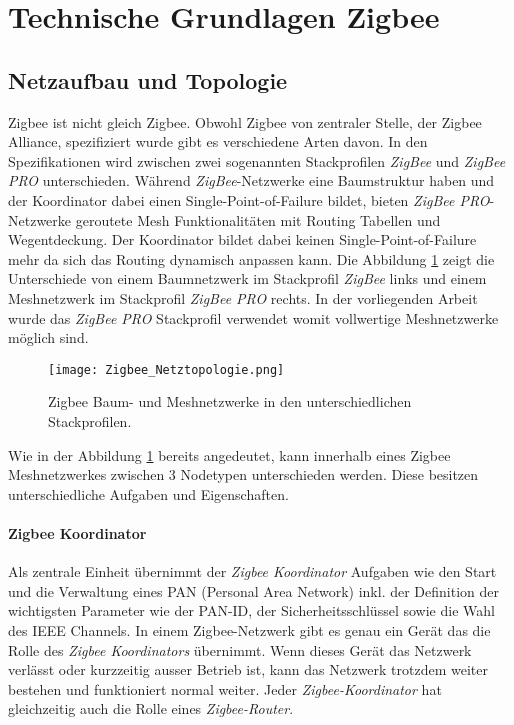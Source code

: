 \clearpage
\section{Technische Grundlagen Zigbee}\label{sec:TechnischeGrundlagenZigbee}

\subsection{Netzaufbau und Topologie}\label{subsec:NetzaufbauundTopologie}


Zigbee ist nicht gleich Zigbee. Obwohl Zigbee von zentraler Stelle, der Zigbee Alliance, spezifiziert wurde gibt es verschiedene Arten davon. In den Spezifikationen wird zwischen zwei sogenannten Stackprofilen \textit{ZigBee} und \textit{ZigBee PRO} unterschieden.
Während \textit{ZigBee}-Netzwerke eine Baumstruktur haben und der Koordinator dabei einen Single-Point-of-Failure bildet, bieten \textit{ZigBee PRO}-Netzwerke geroutete Mesh Funktionalitäten mit Routing Tabellen und Wegentdeckung. Der Koordinator bildet dabei keinen Single-Point-of-Failure mehr da sich das Routing dynamisch anpassen kann.
Die Abbildung \ref{fig:NetzwerktopologienZigbee} zeigt die Unterschiede von einem Baumnetzwerk im Stackprofil \textit{ZigBee} links und einem Meshnetzwerk im Stackprofil \textit{ZigBee PRO} rechts.
In der vorliegenden Arbeit wurde das \textit{ZigBee PRO} Stackprofil verwendet womit vollwertige Meshnetzwerke möglich sind.

\begin{figure}[h]
	\centering
	\texttt{[image: Zigbee\_Netztopologie.png]}
	\caption{Zigbee Baum- und Meshnetzwerke in den unterschiedlichen Stackprofilen. \cite{markus_krause_rainer_konrad_drahtlose_2014}}
	\label{fig:NetzwerktopologienZigbee}
\end{figure}

Wie in der Abbildung \ref{fig:NetzwerktopologienZigbee} bereits angedeutet, kann innerhalb eines Zigbee Meshnetzwerkes zwischen 3 Nodetypen unterschieden werden. Diese besitzen unterschiedliche Aufgaben und Eigenschaften.

\paragraph{Zigbee Koordinator}\label{par:ZigbeeKoordinator}
Als zentrale Einheit übernimmt der \textit{Zigbee Koordinator} Aufgaben wie den Start und die Verwaltung eines PAN (Personal Area Network) inkl. der Definition der wichtigsten Parameter wie der PAN-ID, der Sicherheitsschlüssel sowie die Wahl des IEEE Channels.
In einem Zigbee-Netzwerk gibt es genau ein Gerät das die Rolle des \textit{Zigbee Koordinators} übernimmt. Wenn dieses Gerät das Netzwerk verlässt oder kurzzeitig ausser Betrieb ist, kann das Netzwerk trotzdem weiter bestehen und funktioniert normal weiter.
Jeder \textit{Zigbee-Koordinator} hat gleichzeitig auch die Rolle eines \textit{Zigbee-Router}.

